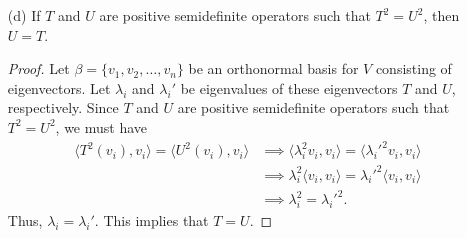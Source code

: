 \begin{enumerate}
\begin{proof}
        \[  [T]_{\beta} = Q [T]_{\beta'} Q^{-1}.  \]
        Let \( D = [T]_{\beta'} \) and define the linear operator \( U: V \to V    \) such that \( U({v}_{i}) = \sqrt{ {\lambda}_{i}  } {v}_{i} \). Define the matrix representation of this linear operator with \( E = [U]_{\beta'} \). Note that \( E  \) is also diagonal since \( D  \) is diagonal. Furthermore, we have \( E^{2} = D \). So, we have      
        \begin{align*}
            [T]_{\beta} &= Q DQ^{-1} \\
                        &= Q^{*} EE Q  \\
                        &=  (E^{*}Q)^{*} (EQ) \\
                        &= (EQ)^{*} (EQ).
        \end{align*}
        Define \( B = EQ \) to get our desired result.
        \end{proof}
    \item[(d)] If \( T  \) and \( U  \) are positive semidefinite operators such that \( T^{2} = U^{2} \), then \( U = T  \).     
        \begin{proof}
        Let \( \beta = \{ {v}_{1}, {v}_{2}, \dots, {v}_{n} \}   \) be an orthonormal basis for \( V  \) consisting of eigenvectors. Let \( {\lambda}_{i} \) and \( {\lambda}_{i}' \) be eigenvalues of these eigenvectors \( T  \) and \( U  \), respectively. Since \( T  \) and \( U  \) are positive semidefinite operators such that \( T^{2} = U^{2} \), we must have 
       \begin{align*}
           \langle T^{2}({v}_{i}) , {v}_{i} \rangle = \langle U^{2}({v}_{i}) , {v}_{i} \rangle &\implies \langle \lambda_i^{2} {v}_{i}  ,  {v}_{i}  \rangle = \langle  {\lambda}_{i}'^{2} {v}_{i}  ,  {v}_{i}  \rangle \\
                                                                                               &\implies {\lambda}_{i}^{2} \langle {v}_{i}  , {v}_{i}  \rangle = {\lambda}_{i}'^{2} \langle {v}_{i}  , {v}_{i}  \rangle \\
                                                                                               &\implies {\lambda}_{i}^{2} = {\lambda}_{i}'^{2}. 
       \end{align*} 
       Thus, \( {\lambda}_{i} = {\lambda}_{i}' \). This implies that \( T = U  \).


\end{proof}
\end{enumerate}
